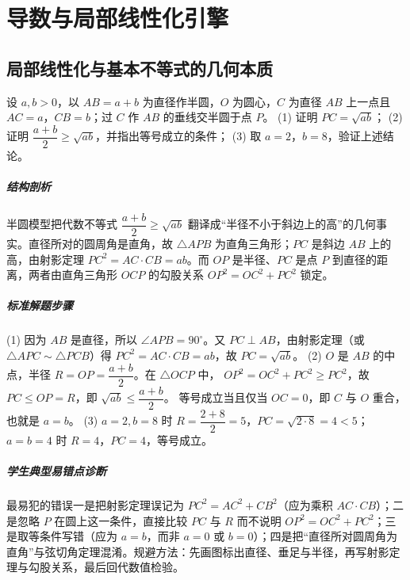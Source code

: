 \chapter{导数与局部线性化引擎}

\section{局部线性化与基本不等式的几何本质}

\begin{problem}
设 $a,b>0$，以 $AB=a+b$ 为直径作半圆，$O$ 为圆心，$C$ 为直径 $AB$ 上一点且 $AC=a$，$CB=b$；过 $C$ 作 $AB$ 的垂线交半圆于点 $P$。
(1) 证明 $PC=\sqrt{ab}$；
(2) 证明 $\dfrac{a+b}{2}\ge\sqrt{ab}$，并指出等号成立的条件；
(3) 取 $a=2$，$b=8$，验证上述结论。
\end{problem}
\begin{solution}
\paragraph{结构剖析}
半圆模型把代数不等式 $\dfrac{a+b}{2}\ge\sqrt{ab}$ 翻译成“半径不小于斜边上的高”的几何事实。直径所对的圆周角是直角，故 $\triangle APB$ 为直角三角形；$PC$ 是斜边 $AB$ 上的高，由射影定理 $PC^2=AC\cdot CB=ab$。而 $OP$ 是半径、$PC$ 是点 $P$ 到直径的距离，两者由直角三角形 $OCP$ 的勾股关系 $OP^2=OC^2+PC^2$ 锁定。
\paragraph{标准解题步骤}
(1) 因为 $AB$ 是直径，所以 $\angle APB=90^\circ$。又 $PC\perp AB$，由射影定理（或 $\triangle APC\sim\triangle PCB$）得
$PC^2=AC\cdot CB=ab$，故 $PC=\sqrt{ab}$。
(2) $O$ 是 $AB$ 的中点，半径 $R=OP=\dfrac{a+b}{2}$。在 $\triangle OCP$ 中，
$OP^2=OC^2+PC^2\ge PC^2$，故 $PC\le OP=R$，即 $\sqrt{ab}\le\dfrac{a+b}{2}$。
等号成立当且仅当 $OC=0$，即 $C$ 与 $O$ 重合，也就是 $a=b$。
(3) $a=2,b=8$ 时 $R=\dfrac{2+8}{2}=5$，$PC=\sqrt{2\cdot8}=4<5$；$a=b=4$ 时 $R=4$，$PC=4$，等号成立。
\paragraph{学生典型易错点诊断}
最易犯的错误一是把射影定理误记为 $PC^2=AC^2+CB^2$（应为乘积 $AC\cdot CB$）；二是忽略 $P$ 在圆上这一条件，直接比较 $PC$ 与 $R$ 而不说明 $OP^2=OC^2+PC^2$；三是取等条件写错（应为 $a=b$，而非 $a=0$ 或 $b=0$）；四是把“直径所对圆周角为直角”与弦切角定理混淆。规避方法：先画图标出直径、垂足与半径，再写射影定理与勾股关系，最后回代数值检验。
\end{solution}

